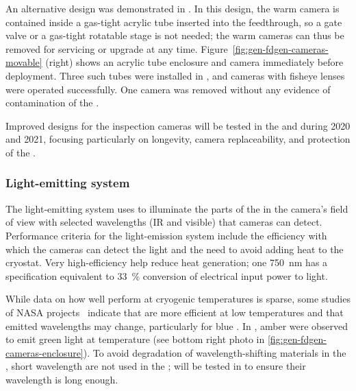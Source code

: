 An alternative design was demonstrated in . In this design, the warm camera is contained inside a gas-tight acrylic tube inserted into the feedthrough, so a gate valve or a gas-tight rotatable stage is not needed; the warm cameras can thus be removed for servicing or upgrade at any time. Figure~\ref{fig:gen-fdgen-cameras-movable} (right) shows an acrylic tube enclosure and camera immediately before deployment.
Three such tubes were installed in , and cameras with fisheye lenses were operated successfully.  One camera was removed without any evidence of contamination of the .


Improved designs for the inspection cameras will be tested in the  and  during 2020 and 2021, focusing particularly on longevity, camera replaceability, and protection of the .

\subsubsection{Light-emitting system}
The light-emitting system uses  to illuminate
the parts of the %
 in the camera's field of view with selected
wavelengths (IR and visible) that cameras can detect.  Performance criteria for the light-emission system include the efficiency with which the cameras can detect the light and the need to avoid
adding heat to the cryostat. Very high-efficiency
help reduce heat generation; one \SI{750}{nm}  \cite{lumileds-DS144-pdf}
has a specification equivalent to
\SI{33}{\%} conversion of electrical input power to light.

While data on how well  perform at cryogenic temperatures
is sparse, some studies of NASA projects~\cite{Carron:2017zzz}
indicate that  are more efficient at low temperatures and
that emitted wavelengths may change, particularly for blue
.  In , amber  were observed  to
emit green light at  temperature (see bottom right photo
in \ref{fig:gen-fdgen-cameras-enclosure}).  To avoid degradation of
wavelength-shifting materials in the , short wavelength
 are not used in the ;  will be tested
in  to ensure their wavelength is long enough.



